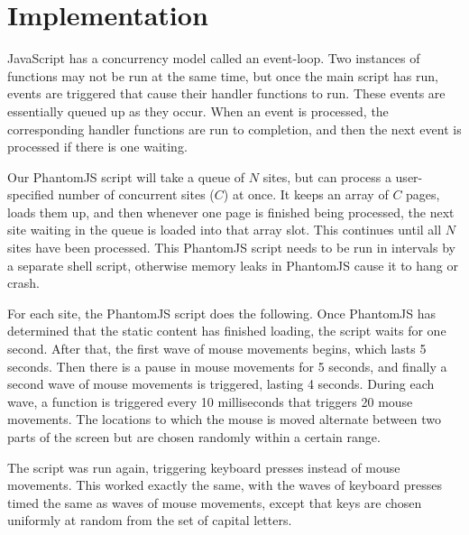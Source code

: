 \documentclass[letterpaper,twocolumn,10pt]{article}
\begin{document}
\section{Implementation}

JavaScript has a concurrency model called an event-loop. Two instances of functions may not be run at the same time, but once the main script has run, events are triggered that cause their handler functions to run. These events are essentially queued up as they occur. When an event is processed, the corresponding handler functions are run to completion, and then the next event is processed if there is one waiting.

Our PhantomJS script will take a queue of $N$ sites, but can process a user-specified number of concurrent sites ($C$) at once. It keeps an array of $C$ pages, loads them up, and then whenever one page is finished being processed, the next site waiting in the queue is loaded into that array slot. This continues until all $N$ sites have been processed. This PhantomJS script needs to be run in intervals by a separate shell script, otherwise memory leaks in PhantomJS cause it to hang or crash.

For each site, the PhantomJS script does the following. Once PhantomJS has determined that the static content has finished loading, the script waits for one second. After that, the first wave of mouse movements begins, which lasts 5 seconds. Then there is a pause in mouse movements for 5 seconds, and finally a second wave of mouse movements is triggered, lasting 4 seconds. During each wave, a function is triggered every 10 milliseconds that triggers 20 mouse movements. The locations to which the mouse is moved alternate between two parts of the screen but are chosen randomly within a certain range.

The script was run again, triggering keyboard presses instead of mouse movements. This worked exactly the same, with the waves of keyboard presses timed the same as waves of mouse movements, except that keys are chosen uniformly at random from the set of capital letters.
\end{document}
